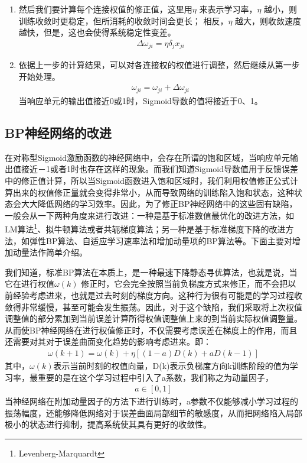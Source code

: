 \begin{enumerate}[noitemsep,topsep=0pt,parsep=0pt,partopsep=0pt]
	\item 然后我们要计算每个连接权值的修正值，这里用$\eta$ 来表示学习率，$\eta$ 越小，则训练收敛时更稳定，但所消耗的收敛时间会更长；
	相反，$\eta$ 越大，则收敛速度越快，但是，这也会使得系统稳定性变差。
	 	\begin{align}
	 		\Delta \omega_{ji} = \eta \delta_{j} x_{ji}
	 	\end{align}
	 \item 依据上一步的计算结果，可以对各连接权的权值进行调整，然后继续从第一步开始处理。
	 	\begin{align}
	 		\omega_{ji} = \omega_{ji} + \Delta\omega_{ji}
	 	\end{align}
	 	当响应单元的输出值接近0或1时，Sigmoid导数的值将接近于0、1。
\end{enumerate}

\subsection{BP神经网络的改进}
在对称型Sigmoid激励函数的神经网络中，会存在所谓的饱和区域，当响应单元输出值接近－1或者1时也存在这样的现象。而我们知道Sigmoid导数值用于反馈误差中的修正值计算，所以当Sigmoid函数进入饱和区域时，我们利用权值修正公式计算出来的权值修正量就会变得非常小，从而导致网络的训练陷入饱和状态，这种状态会大大降低网络的学习效率。因此，为了修正BP神经网络中的这些固有缺陷，一般会从一下两种角度来进行改进：一种是基于标准数值最优化的改进方法，如LM算法\footnote{Levenberg-Marquardt}、拟牛顿算法或者共轭梯度算法；另一种是基于标准梯度下降的改进方法，如弹性BP算法、自适应学习速率法和增加动量项的BP算法等\supercite{65}。下面主要对增加动量法作简单介绍。

我们知道，标准BP算法在本质上，是一种最速下降静态寻优算法，也就是说，当它在进行权值$\omega(k)$ 修正时，它会完全按照当前负梯度方式来修正，而不会把以前经验考虑进来，也就是过去时刻的梯度方向。这种行为很有可能是的学习过程收敛得非常缓慢，甚至可能会发生振荡。因此，对于这个缺陷，我们采取将上次权值调整值的部分累加到当前误差计算所得权值调整值上来的到当前实际权值调整量。从而使BP神经网络在进行权值修正时，不仅需要考虑误差在梯度上的作用，而且还需要对其对于误差曲面变化趋势的影响考虑进来。即：
\begin{align}
	\omega(k+1) = \omega(k) + \eta[(1-a)D(k) + aD(k-1)]
\end{align}
其中，$\omega(k)$表示当前时刻的权值向量，D(k)表示负梯度方向k训练阶段的值为学习率，最重要的是在这个学习过程中引入了a系数，我们称之为动量因子，
\begin{align}
	a \in [0, 1]
\end{align}
当神经网络在附加动量因子的方法下进行训练时，a参数不仅能够减小学习过程的振荡幅度，还能够降低网络对于误差曲面局部细节的敏感度，从而把网络陷入局部极小的状态进行抑制，提高系统使其具有更好的收敛性。

